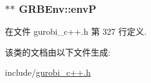 \subsubsection[{\texorpdfstring{envP}{envP}}]{$\ast$$\ast$ G\+R\+B\+Env\+::envP\hspace{0.3cm}{\ttfamily [private]}}\hypertarget{classGRBEnv_aa55900386bf034ad127526269ad6465b}{}\label{classGRBEnv_aa55900386bf034ad127526269ad6465b}


在文件 gurobi\+\_\+c++.\+h 第 327 行定义.



该类的文档由以下文件生成\+:\begin{DoxyCompactItemize}
\item 
include/\hyperlink{gurobi__c_09_09_8h}{gurobi\+\_\+c++.\+h}\end{DoxyCompactItemize}
